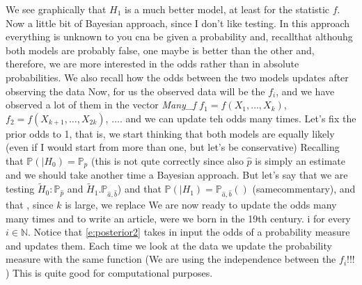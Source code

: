 	We see graphically that $H_1$ is a much better model, at least for the statistic $f$.  
Now a little bit of Bayesian approach, since I don't like testing. In this approach everything is unknown to you cna be given a probability and, recallthat althouhg both models are probably false, one maybe is better than the other and, therefore, we are more interested in the odds 
rather than in absolute probabilities. We also recall how the odds between the two models updates after observing the data
Now, for us the observed data will be the $f_i$, and we have observed a lot of them in the vector \textit{ Many\_f} $f_1 = f(X_1, \ldots, X_k)$, $f_2 = f(X_{ k + 1 }, \ldots, X_{2k })$, $\ldots$. and we can update teh odds many times. Let's fix the prior odds to 1, that is, we start thinking that both models are equally likely (even if I would start from more than one, but let's be conservative)
 	Recalling  that $\mathbb P( |H_0 ) = \mathbb P_p$  (this is not qute correctly since also $\hat p$ is simply an estimate and we should take another time a Bayesian approach. But let's say that we are testing $\tilde H_0 : \mathbb P_{\hat p }$ and $\tilde H_1. \mathbb P_{\hat a, \hat b }$) and that $\mathbb P(|H_1) = \mathbb P_{\hat a, \hat b} ( )$ (samecommentary), and that , since $k$ is large, we replace  
We are now ready to update the odds many many times and to write an article, were we born in the 19th century. i
	for every $i \in \mathbb N$. Notice that \eqref{e:posterior2} takes in input the odds of a probability measure and updates them. Each time we look at the data we update the probability measure with the same function (We are using the independence between the $f_i$!!! ) This is quite good for computational purposes.     
